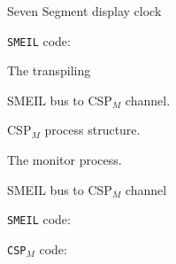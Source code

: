 \documentclass[13pt]{beamer}
\newcommand{\cspm}{CSP$_M$}
\begin{document}
\begin{frame}{Seven Segment display clock}
 \begin{block}{}
  \texttt{SMEIL} code:
    \vspace{5mm}

     \scalebox{0.8}{\usebox{\smeilexamplecode}}
 \end{block}
\end{frame}
%
\begin{frame}{The transpiling}
 \begin{block}{}
   SMEIL bus to \cspm{} channel.
 \end{block}

 \pause

 \begin{block}{}
   \cspm{} process structure.
 \end{block}

 \pause

 \begin{block}{}
   The monitor process.
 \end{block}
\end{frame}

%
\begin{frame}{SMEIL bus to \cspm{} channel}
 \begin{block}{}
   \texttt{SMEIL} code:
     \vspace{5mm}

      \scalebox{0.8}{\usebox{\smeilchannelexample}}
 \end{block}
 \pause
 \begin{block}{}
    \texttt{\cspm{}} code:
      \vspace{5mm}

       \scalebox{0.8}{\usebox{\cspmchannelexample}}
 \end{block}
\end{frame}
\end{document}
